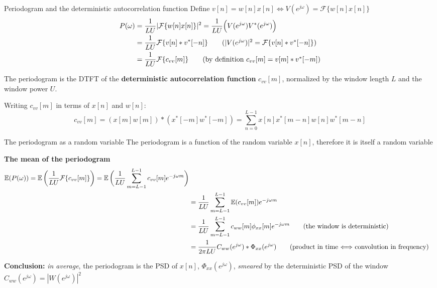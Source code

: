 \documentclass[10pt]{beamer}
\begin{document}
%
\begin{frame}{Periodogram and the deterministic autocorrelation function}
Define $v[n] = w[n]x[n] \Longleftrightarrow V(e^{j\omega}) = \mathcal{F}\{w[n]x[n]\}$
\begin{align*}
	P(\omega) &= \frac{1}{LU}|\mathcal{F}\{w[n]x[n]\}|^2 =  \frac{1}{LU}\Big(V(e^{j\omega})V^*(e^{j\omega})\Big) \\
	&=\frac{1}{LU}\mathcal{F}\{v[n]\ast v^*[-n]\} \tag{$|V(e^{j\omega})|^2 =\mathcal{F}\{v[n]\ast v^*[-n]\}$}  \\
	&=\frac{1}{LU}\mathcal{F}\{c_{vv}[m]\} \tag{by definition $c_{vv}[m] = v[m]\ast v^*[-m]$}
\end{align*}

The periodogram is the DTFT of the \textbf{deterministic autocorrelation function} $c_{vv}[m]$, normalized by the window length $L$ and the window power $U$.

\vspace{0.5cm}
Writing $c_{vv}[m]$ in terms of $x[n]$ and $w[n]$:
\begin{equation*}
	c_{vv}[m] = (x[m]w[m])\ast (x^*[-m]w^*[-m]) = \sum_{n = 0}^{L-1} x[n]x^*[m-n]w[n]w^*[m-n]
\end{equation*}

\end{frame}

\begin{frame}{The periodogram as a random variable}
The periodogram is a function of the random variable $x[n]$, therefore it is itself a random variable

\textbf{The mean of the periodogram}
\begin{align*}
	\operatorname{\mathbb{E}}(P(\omega)) = \operatorname{\mathbb{E}}\bigg(\frac{1}{LU}\mathcal{F}\{c_{vv}[m]\}\bigg) = \operatorname{\mathbb{E}}\bigg(\frac{1}{LU}\sum_{m=L-1}^{L-1}c_{vv}[m]e^{-j\omega m}\bigg) \\
	& = \frac{1}{LU}\sum_{m=L-1}^{L-1}\operatorname{\mathbb{E}}(c_{vv}[m])e^{-j\omega m} \\
	& = \frac{1}{LU}\sum_{m=L-1}^{L-1}c_{ww}[m]\phi_{xx}[m]e^{-j\omega m} \tag{the window is deterministic} \\
	& = \frac{1}{2\pi LU}C_{ww}(e^{j\omega})\ast \Phi_{xx}(e^{j\omega}) \tag{product in time $\Longleftrightarrow$ convolution in frequency} \\
\end{align*}

\vspace{-0.25cm}
\textbf{Conclusion:} \textit{in average}, the periodogram is the PSD of $x[n]$, $\Phi_{xx}(e^{j\omega})$, \textit{smeared} by the deterministic PSD of the window $C_{ww}(e^{j\omega}) = |W(e^{j\omega})|^2$
\end{frame}
\end{document}
